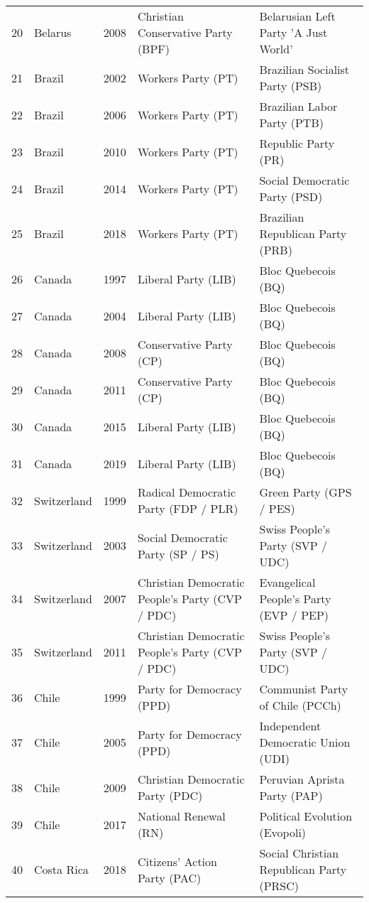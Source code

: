 \documentclass[12pt]{article}
\begin{document}
\begin{table}[ht]
\begin{footnotesize}
\begin{tabular}{rllll}
  20 & Belarus & 2008 &   Christian Conservative Party (BPF) &   Belarusian Left Party 'A Just World' \\ 
  21 & Brazil & 2002 &   Workers Party (PT) &   Brazilian Socialist Party (PSB) \\ 
  22 & Brazil & 2006 &   Workers Party (PT) &   Brazilian Labor Party (PTB) \\ 
  23 & Brazil & 2010 &   Workers Party (PT) &   Republic Party (PR) \\ 
  24 & Brazil & 2014 &   Workers Party (PT) &   Social Democratic Party (PSD) \\ 
  25 & Brazil & 2018 &   Workers Party (PT) &   Brazilian Republican Party (PRB) \\ 
  26 & Canada & 1997 &   Liberal Party (LIB) &   Bloc Quebecois (BQ) \\ 
  27 & Canada & 2004 &   Liberal Party (LIB) &   Bloc Quebecois (BQ) \\ 
  28 & Canada & 2008 &   Conservative Party (CP) &   Bloc Quebecois (BQ) \\ 
  29 & Canada & 2011 &   Conservative Party (CP) &   Bloc Quebecois (BQ) \\ 
  30 & Canada & 2015 &   Liberal Party (LIB) &   Bloc Quebecois (BQ) \\ 
  31 & Canada & 2019 &   Liberal Party (LIB) &   Bloc Quebecois (BQ) \\ 
  32 & Switzerland & 1999 &   Radical Democratic Party (FDP / PLR)  &   Green Party (GPS / PES) \\ 
  33 & Switzerland & 2003 &   Social Democratic Party (SP / PS) &   Swiss People's Party (SVP / UDC) \\ 
  34 & Switzerland & 2007 &   Christian Democratic People's Party (CVP / PDC) &   Evangelical People's Party (EVP / PEP) \\ 
  35 & Switzerland & 2011 &   Christian Democratic People's Party (CVP / PDC) &   Swiss People's Party (SVP / UDC) \\ 
  36 & Chile & 1999 &   Party for Democracy (PPD) &   Communist Party of Chile (PCCh) \\ 
  37 & Chile & 2005 &   Party for Democracy (PPD) &   Independent Democratic Union (UDI) \\ 
  38 & Chile & 2009 &   Christian Democratic Party (PDC) &   Peruvian Aprista Party (PAP) \\ 
  39 & Chile & 2017 &   National Renewal (RN) &   Political Evolution (Evopoli) \\ 
  40 & Costa Rica & 2018 &   Citizens' Action Party (PAC) &   Social Christian Republican Party (PRSC) \\ 

\end{tabular}
\end{footnotesize}
\end{table}
\end{document}
